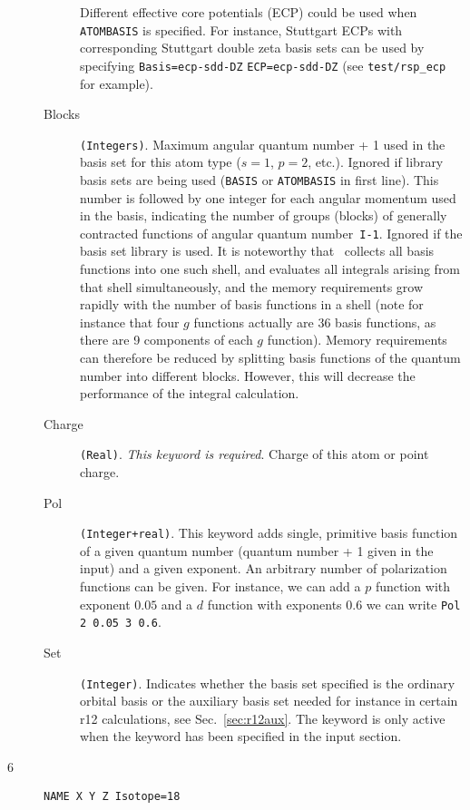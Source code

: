 \begin{description}
\begin{description}
  Different effective core potentials (ECP) could be used when \verb|ATOMBASIS|
  is specified. For instance, Stuttgart ECPs with corresponding
  Stuttgart double zeta basis sets can be used by specifying
  \verb|Basis=ecp-sdd-DZ| \verb|ECP=ecp-sdd-DZ| (see \verb|test/rsp_ecp| for example).
\item[Blocks] \verb|(Integers)|. Maximum angular quantum number + 1 used in the
basis set for this atom type ($s=1$, $p=2$, etc.).
Ignored if library basis sets are being used (\verb|BASIS| or
\verb|ATOMBASIS| in first line). This number is followed by one
integer for each angular momentum used in the basis, indicating 
the number of groups (blocks) of generally contracted
functions of angular quantum number~{\tt I-1}.
Ignored if the basis set library is used. \newline
It is noteworthy that
\dalton\ collects all basis functions into one such shell, and
evaluates all integrals arising from that 
shell simultaneously, and
the memory requirements grow rapidly with the number of basis
functions in a shell (note for instance that four $g$ functions
actually are 36 basis functions,
as there are 9 components of each $g$ function).
Memory requirements can therefore be reduced by splitting
basis functions of the quantum number into different blocks. However,
this will decrease the performance of the
integral calculation.
\item[Charge] \verb|(Real)|. {\em This keyword is required\/}.
  Charge of this atom or point charge. 
\item[Pol] \verb|(Integer+real)|. This keyword adds single, primitive
  basis function of a given quantum number (quantum number + 1 given
  in the input) and a given exponent. An arbitrary number of
  polarization functions can be given. For instance, we can add a $p$
  function with exponent $0.05$ and a $d$ function with exponents
  $0.6$ we can write \verb|Pol 2 0.05 3 0.6|.
\item[Set] \verb|(Integer)|. Indicates whether the basis set specified
  is the ordinary orbital basis or the auxiliary basis set needed for
  instance in certain r12 calculations, see
  Sec.~\ref{sec:r12aux}. The keyword is only active when the keyword
   has been specified in the  input section.
\end{description}
\item[6] \verb|NAME X Y Z Isotope=18|

\end{description}
